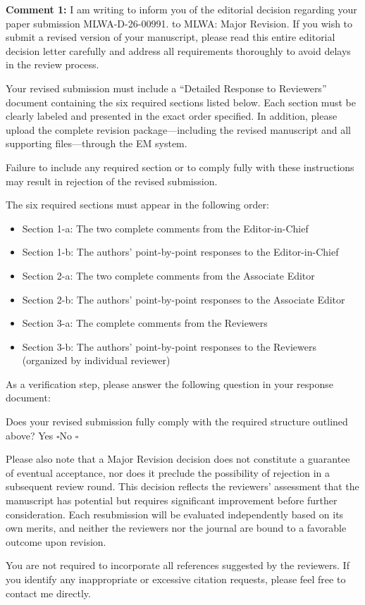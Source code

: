 \documentclass[a4paper,11pt]{article}
\newcommand{\reviewercomment}[2]{%
    \begin{reviewerscomment}
        \textbf{Comment #1:} #2
    \end{reviewerscomment}
}
\begin{document}
\reviewercomment{1}{
I am writing to inform you of the editorial decision regarding your paper
submission MLWA-D-26-00991. to MLWA: Major Revision. If you wish to
submit a revised version of your manuscript, please read this entire editorial
decision letter carefully and address all requirements thoroughly to avoid delays
in the review process.

Your revised submission must include a ``Detailed Response to Reviewers''
document containing the six required sections listed below. Each section must be
clearly labeled and presented in the exact order specified. In addition, please
upload the complete revision package---including the revised manuscript and all
supporting files---through the EM system.

Failure to include any required section or to comply fully with these instructions
may result in rejection of the revised submission.

The six required sections must appear in the following order:

\begin{itemize}
    \item Section 1-a: The two complete comments from the Editor-in-Chief
    \item Section 1-b: The authors' point-by-point responses to the Editor-in-Chief
    \item Section 2-a: The two complete comments from the Associate Editor
    \item Section 2-b: The authors' point-by-point responses to the Associate Editor
    \item Section 3-a: The complete comments from the Reviewers
    \item Section 3-b: The authors' point-by-point responses to the Reviewers
    (organized by individual reviewer)
\end{itemize}

As a verification step, please answer the following question in your response
document:

Does your revised submission fully comply with the required structure outlined
above? Yes $\square$\quad No $\square$

Please also note that a Major Revision decision does not constitute a guarantee
of eventual acceptance, nor does it preclude the possibility of rejection in a
subsequent review round. This decision reflects the reviewers' assessment that
the manuscript has potential but requires significant improvement before further
consideration. Each resubmission will be evaluated independently based on its own
merits, and neither the reviewers nor the journal are bound to a favorable outcome
upon revision.

You are not required to incorporate all references suggested by the reviewers.
If you identify any inappropriate or excessive citation requests, please feel
free to contact me directly.
}
\end{document}
